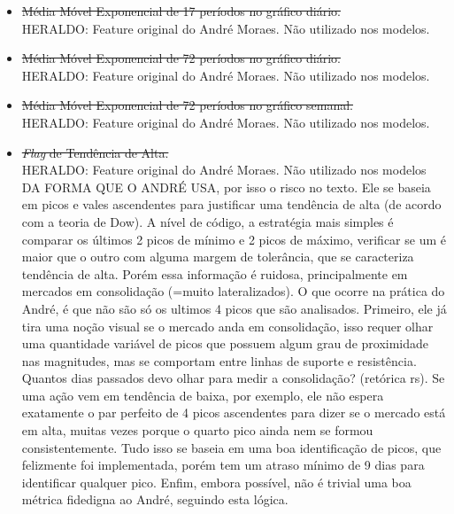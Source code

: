 \begin{itemize}
    \item \sout{Média Móvel Exponencial de 17 períodos no gráfico diário.} \\
    \color{red} HERALDO: Feature original do André Moraes. Não utilizado nos modelos. 

    \item \sout{Média Móvel Exponencial de 72 períodos no gráfico diário.} \\
    \color{red} HERALDO: Feature original do André Moraes. Não utilizado nos modelos. 

    \item \sout{Média Móvel Exponencial de 72 períodos no gráfico semanal.} \\
    \color{red} HERALDO: Feature original do André Moraes. Não utilizado nos modelos. 

    \item \sout{\textit{Flag} de Tendência de Alta.} \\
    \color{red} HERALDO: Feature original do André Moraes. Não utilizado nos modelos DA FORMA QUE O ANDRÉ USA, por isso o risco no texto. Ele se baseia em picos e vales ascendentes para justificar uma tendência de alta (de acordo com a teoria de Dow). A nível de código, a estratégia mais simples é comparar os últimos 2 picos de mínimo e 2 picos de máximo, verificar se um é maior que o outro com alguma margem de tolerância, que se caracteriza tendência de alta. Porém essa informação é ruidosa, principalmente em mercados em consolidação (=muito lateralizados). O que ocorre na prática do André, é que não são só os ultimos 4 picos que são analisados. Primeiro, ele já tira uma noção visual se o mercado anda em consolidação, isso requer olhar uma quantidade variável de picos que possuem algum grau de proximidade nas magnitudes, mas se comportam entre linhas de suporte e resistência. Quantos dias passados devo olhar para medir a consolidação? (retórica rs). Se uma ação vem em tendência de baixa, por exemplo, ele não espera exatamente o par perfeito de 4 picos ascendentes para dizer se o mercado está em alta, muitas vezes porque o quarto pico ainda nem se formou consistentemente. Tudo isso se baseia em uma boa identificação de picos, que felizmente foi implementada, porém tem um atraso mínimo de 9 dias para identificar qualquer pico. Enfim, embora possível, não é trivial uma boa métrica fidedigna ao André, seguindo esta lógica. 


\end{itemize}
